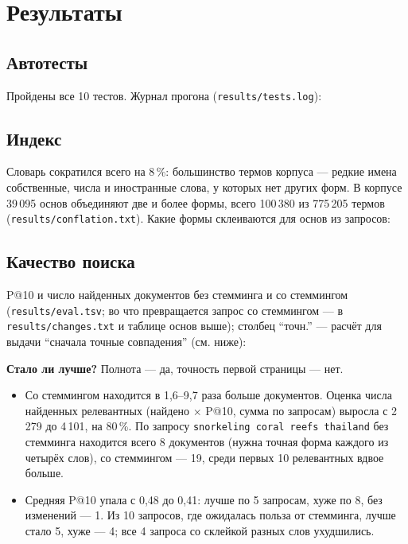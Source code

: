 \section{Результаты}
\subsection{Автотесты}
Пройдены все 10 тестов. Журнал прогона (\texttt{results/tests.log}):

{\scriptsize
{}
}

\subsection{Индекс}
\begin{center}
\small

\end{center}
Словарь сократился всего на 8\,\%: большинство термов корпуса --- редкие имена собственные, числа и иностранные слова, у которых нет других форм. В корпусе 39\,095 основ объединяют две и более формы, всего 100\,380 из 775\,205 термов (\texttt{results/conflation.txt}). Какие формы склеиваются для основ из запросов:
\begin{center}
\small

\end{center}

\subsection{Качество поиска}
P@10 и число найденных документов без стемминга и со стеммингом (\texttt{results/eval.tsv}; во что превращается запрос со стеммингом --- в \texttt{results/changes.txt} и таблице основ выше); столбец \enquote{точн.} --- расчёт для выдачи \enquote{сначала точные совпадения} (см. ниже):
\begin{center}
\footnotesize

\end{center}

\textbf{Стало ли лучше?} Полнота --- да, точность первой страницы --- нет.
\begin{itemize}
    \item Со стеммингом находится в 1,6--9,7 раза больше документов. Оценка числа найденных релевантных (найдено $\times$ P@10, сумма по запросам) выросла с 2\,279 до 4\,101, на 80\,\%. По запросу \texttt{snorkeling coral reefs thailand} без стемминга находится всего 8 документов (нужна точная форма каждого из четырёх слов), со стеммингом --- 19, среди первых 10 релевантных вдвое больше.
    \item Средняя P@10 упала с 0,48 до 0,41: лучше по 5 запросам, хуже по 8, без изменений --- 1. Из 10 запросов, где ожидалась польза от стемминга, лучше стало 5, хуже --- 4; все 4 запроса со склейкой разных слов ухудшились.
\end{itemize}

